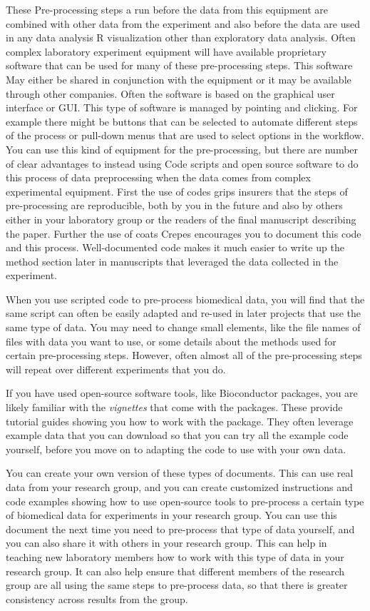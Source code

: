 \documentclass[]{tufte-book}
\begin{document}
These Pre-processing steps a run before the data from this equipment are combined with other data from the experiment and also before the data are used in any data analysis R visualization other than exploratory data analysis. Often complex laboratory experiment equipment will have available proprietary software that can be used for many of these pre-processing steps. This software May either be shared in conjunction with the equipment or it may be available through other companies. Often the software is based on the graphical user interface or GUI. This type of software is managed by pointing and clicking. For example there might be buttons that can be selected to automate different steps of the process or pull-down menus that are used to select options in the workflow. You can use this kind of equipment for the pre-processing, but there are number of clear advantages to instead using Code scripts and open source software to do this process of data preprocessing when the data comes from complex experimental equipment. First the use of codes grips insurers that the steps of pre-processing are reproducible, both by you in the future and also by others either in your laboratory group or the readers of the final manuscript describing the paper. Further the use of coats Crepes encourages you to document this code and this process. Well-documented code makes it much easier to write up the method section later in manuscripts that leveraged the data collected in the experiment.

When you use scripted code to pre-process biomedical data, you will find that
the same script can often be easily adapted and re-used in later projects that
use the same type of data. You may need to change small elements, like the file
names of files with data you want to use, or some details about the methods
used for certain pre-processing steps. However, often almost all of the pre-processing
steps will repeat over different experiments that you do.

If you have used open-source software tools, like Bioconductor packages, you
are likely familiar with the \emph{vignettes} that come with the packages. These
provide tutorial guides showing you how to work with the package. They often
leverage example data that you can download so that you can try all the
example code yourself, before you move on to adapting the code to use with
your own data.

You can create your own version of these types of documents. This can use
real data from your research group, and you can create customized instructions
and code examples showing how to use open-source tools to pre-process a
certain type of biomedical data for experiments in your research group.
You can use this document the next time you need to pre-process that type
of data yourself, and you can also share it with others in your research
group. This can help in teaching new laboratory members how to work with
this type of data in your research group. It can also help ensure that
different members of the research group are all using the same steps to
pre-process data, so that there is greater consistency across results from
the group.
\end{document}
